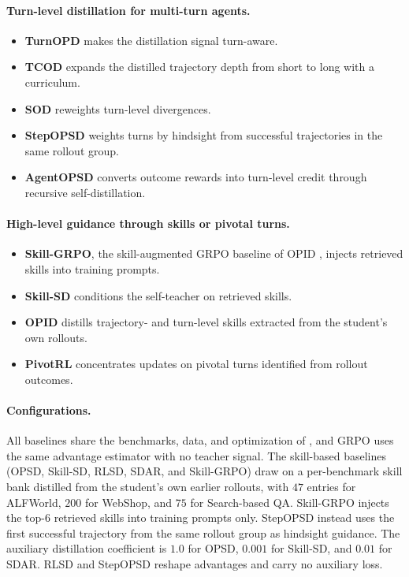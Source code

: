 \paragraph{Turn-level distillation for multi-turn agents.}
\begin{itemize}
\item \textbf{TurnOPD} \citep{zhou2026turnopd} makes the distillation signal turn-aware.
\item \textbf{TCOD} \citep{wang2026tcod} expands the distilled trajectory depth from short to long with a curriculum.
\item \textbf{SOD} \citep{zhong2026sod} reweights turn-level divergences.
\item \textbf{StepOPSD} \citep{zhang2026stepopsd} weights turns by hindsight from successful trajectories in the same rollout group.
\item \textbf{AgentOPSD} \citep{wang2026agentopsd} converts outcome rewards into turn-level credit through recursive self-distillation.
\end{itemize}

\paragraph{High-level guidance through skills or pivotal turns.}
\begin{itemize}
\item \textbf{Skill-GRPO}, the skill-augmented GRPO baseline of OPID \citep{yang2026opid}, injects retrieved skills into training prompts.
\item \textbf{Skill-SD} \citep{wang2026skillsd} conditions the self-teacher on retrieved skills.
\item \textbf{OPID} distills trajectory- and turn-level skills extracted from the student's own rollouts.
\item \textbf{PivotRL} \citep{yi2026pivotrl} concentrates updates on pivotal turns identified from rollout outcomes.
\end{itemize}

\paragraph{Configurations.} All baselines share the benchmarks, data, and optimization of , and GRPO uses the same advantage estimator with no teacher signal. The skill-based baselines (OPSD, Skill-SD, RLSD, SDAR, and Skill-GRPO) draw on a per-benchmark skill bank distilled from the student's own earlier rollouts, with $47$ entries for ALFWorld, $200$ for WebShop, and $75$ for Search-based QA. Skill-GRPO injects the top-$6$ retrieved skills into training prompts only. StepOPSD instead uses the first successful trajectory from the same rollout group as hindsight guidance. The auxiliary distillation coefficient is $1.0$ for OPSD, $0.001$ for Skill-SD, and $0.01$ for SDAR. RLSD and StepOPSD reshape advantages and carry no auxiliary loss.

